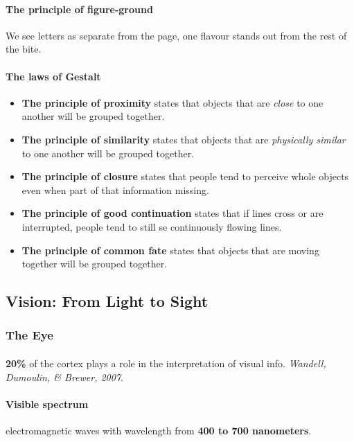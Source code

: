 \documentclass{article}
\begin{document}
	\paragraph{The principle of figure-ground} We see letters as separate from the page, one flavour stands out from the rest of the bite.
	\paragraph{The laws of Gestalt}
	\begin{itemize}
		\item \textbf{The principle of proximity} states that objects that are \emph{close} to one another will be grouped together.
		\item \textbf{The principle of similarity} states that objects that are \emph{physically similar} to one another will be grouped together.
		\item \textbf{The principle of closure} states that people tend to perceive whole objects even when part of that information missing.
		\item \textbf{The principle of good continuation} states that if lines cross or are interrupted, people tend to still se continuously flowing lines.
		\item \textbf{The principle of common fate} states that objects that are moving together will be grouped together.
	\end{itemize}
	\subsection{Vision: From Light to Sight}
	\subsubsection{The Eye}
	\paragraph{} \textbf{20\%} of the cortex plays a role in the interpretation of visual info. \emph{Wandell, Dumoulin, \& Brewer, 2007}.
	\paragraph{Visible spectrum} electromagnetic waves with wavelength from \textbf{400 to 700 nanometers}.
\end{document}
